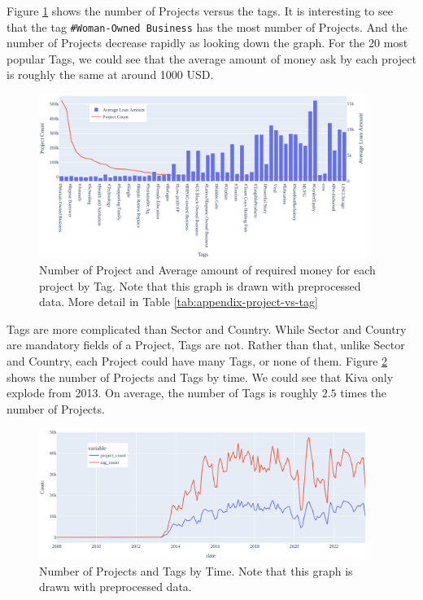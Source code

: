 Figure \ref{fig:project-vs-tag} shows the number of Projects versus the \Gls{tag}s.
It is interesting to see that the tag \lstinline|#Woman-Owned Business| has the most number of Projects.
And the number of Projects decrease rapidly as looking down the graph.
For the 20 most popular Tags, we could see that the average amount of money ask by each project is roughly the same at around 1000 USD.

\begin{figure}[H]
	\centering
	\includegraphics[width=0.95\textwidth]{images/project-vs-tag.pdf}
	\caption[Number of Projects and Average amount of required money for each project by Tag]{
		Number of Project and Average amount of required money for each project by Tag.
		Note that this graph is drawn with preprocessed data.
		More detail in Table \ref{tab:appendix-project-vs-tag}
	}
	\label{fig:project-vs-tag}
\end{figure}

Tags are more complicated than Sector and Country.
While Sector and Country are mandatory fields of a Project, Tags are not.
Rather than that, unlike Sector and Country, each Project could have many Tags, or none of them.
Figure \ref{fig:tag-project-vs-time} shows the number of Projects and Tags by time.
We could see that Kiva only explode from 2013.
On average, the number of Tags is roughly $2.5$ times the number of Projects.

\begin{figure}[H]
	\centering
	\includegraphics[width=0.95\textwidth]{images/tag-project-vs-time.pdf}
	\caption[Number of Projects and Tags by Time]{
		Number of Projects and Tags by Time.
		Note that this graph is drawn with preprocessed data.
	}
	\label{fig:tag-project-vs-time}
\end{figure}


